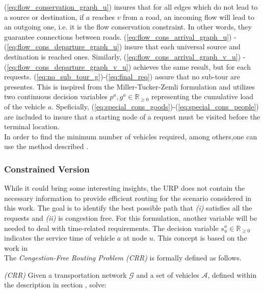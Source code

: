 (\ref{eq:flow_conservation_graph_u}) insures that for all edges which do not lead to a source or destination, if $a$ reaches $v$ from a road, an incoming flow will lead to an outgoing one, i.e. it is the flow conservation constraint. In other words, they guarantee connections between roads. (\ref{eq:flow_cons_arrival_graph_u}) -  (\ref{eq:flow_cons_departure_graph_u}) insure that each universal source and destination is reached ones. Similarly, (\ref{eq:flow_cons_arrival_graph_v_u}) -  (\ref{eq:flow_cons_departure_graph_v_u}) achieves the same result, but for each requests.  (\ref{eq:no_sub_tour_g})-(\ref{eq:final_req}) assure that no sub-tour are presentes. This is inspired from the Miller-Tucker-Zemli formulation and utilizes two continuous decision variables $p^a, g^a \in \mathbb{R}_{\ge0}$ representing the cumulative load of the vehicle $a$. Speficially, (\ref{eq:special_cons_goods})-(\ref{eq:special_cons_people}) are included to insure that a starting node of a request must be visited before the terminal location. \\
In order to find the minimum number of vehicles required, among others,one can use the method described . 
\subsubsection*{Constrained Version}
While it could bring some interesting insights, the URP does not contain the necessary information to provide efficient routing for the scenario considered in this work. The goal is to identify the best possible path that \textit{(i)} satisfies all the requests and \textit{(ii)} is congestion free. For this formulation, another variable will be needed to deal with time-related requirements. The decision variable $s_{u}^a \in \mathbb{R}_{\ge0}$ indicates the service time of vehicle $a$ at node $u$. This concept is based on the work in \cite{inbook_twvrp}\\
The \textit{Congestion-Free Routing Problem (CRR)} is formally defined as follows.\\ 
\begin{algori}{\textit{(CRR)}}
	Given a transportation network $\mathcal{G}$ and a set of vehicles $\mathcal{A}$, defined within the description in section , solve:
\end{algori}


